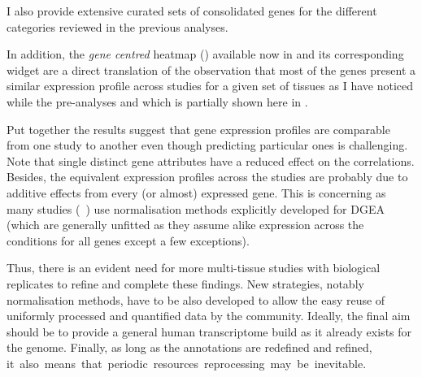 I also provide extensive curated sets of consolidated genes
for the different categories reviewed in the previous analyses.

In addition,
the \emph{gene centred} heatmap () available now
in  and its corresponding widget
are a direct translation of the observation
that most of the genes present a similar expression profile across studies
for a given set of tissues
as I have noticed while the pre-analyses
and which is partially shown here in .\\
\vspace{-\baselineskip}

Put together the results suggest that
gene expression profiles are comparable from one study to another even though
predicting particular ones is challenging.
Note that single distinct gene attributes have a reduced effect on the correlations.
Besides, the equivalent expression profiles across the studies
are probably due to additive effects from every (or almost) expressed gene.
This is concerning as many studies (\eg{}~\cite{Sudmant2015-zt})
use normalisation methods explicitly developed for \gls{DGEA}  %
(which are generally unfitted as
they assume alike expression across the conditions for all genes
except a few exceptions).\\
\vspace{-\baselineskip}

Thus, there is an evident need for more multi-tissue studies
with biological replicates to refine and complete these findings.
New strategies, notably normalisation methods, have to be also developed
to allow the easy reuse of uniformly processed and quantified data by
the community.
Ideally, the final aim should be to provide a general human transcriptome build
as it already exists for the genome.
Finally, as long as the annotations are redefined and refined,
it~also~means~that~periodic~resources~reprocessing~may~be~inevitable.




